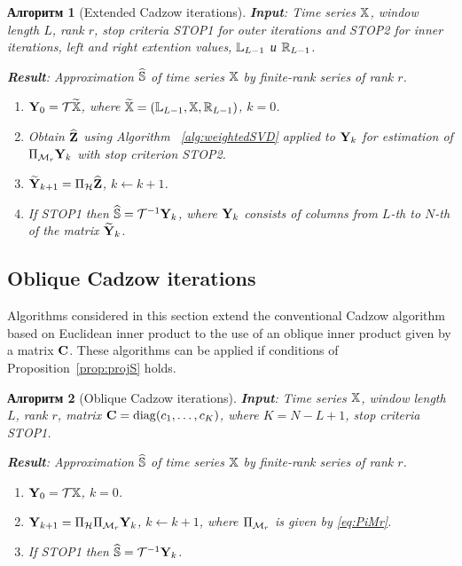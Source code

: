 \documentclass[12pt,a4paper,fleqn,leqno]{article}
\newtheorem{algorithm}{Алгоритм}
\begin{document}
\begin{algorithm}[Extended Cadzow iterations]\label{alg:ECIt}
\textbf{Input}: Time series $\mathbb{X}$, window length $L$, rank $r$,
stop criteria STOP1 for outer iterations and STOP2 for inner iterations,
left and right extention values, $\mathbb{L}_{L-1}$ и $\mathbb{R}_{L-1}$.

\textbf{Result}:
Approximation $\widehat{\mathbb{S}}$ of time series $\mathbb{X}$ by finite-rank series of rank $r$.

\begin{enumerate}
\item
$\mathbf{Y}_0 = \mathcal{T} \widetilde{\mathbb{X}}$, where $\widetilde{\mathbb{X}}=(\mathbb{L}_{L-1}, \mathbb{X}, \mathbb{R}_{L-1})$, $k=0$.
\item
Obtain $\widehat{\mathbf{Z}}$ using Algorithm ~\ref{alg:weightedSVD} applied to $\mathbf{Y}_k$ for estimation of $\Pi_{\mathcal{M}_r} \mathbf{Y}_{k}$ with stop criterion STOP2.
\item
$\widetilde{\mathbf{Y}}_{k+1} = \Pi_{\mathcal{H}}  \widehat{\mathbf{Z}}$, $k\leftarrow k+1$.
\item
If STOP1 then $\widehat{\mathbb{S}} = \mathcal{T}^{-1} \mathbf{Y}_k$, where $\mathbf{Y}_k$ consists of columns from $L$-th to $N$-th of the matrix $\widetilde{\mathbf{Y}}_{k}$.
\end{enumerate}
\end{algorithm}


\subsection{Oblique Cadzow iterations}

Algorithms considered in this section extend the conventional Cadzow algorithm based on Euclidean inner product to the use of an oblique inner product given by a matrix $\mathbf{C}$.
These algorithms can be applied if conditions of Proposition~\ref{prop:projS} holds.

\begin{algorithm}[Oblique Cadzow iterations]
\label{alg:obliqueCadzow}
\textbf{Input}: Time series $\mathbb{X}$, window length $L$, rank $r$, matrix $\mathbf{C}=\mathop{\mathrm{diag}}(c_1,\ldots, c_K)$, where $K=N-L+1$,
stop criteria STOP1.

\textbf{Result}:
Approximation $\widehat{\mathbb{S}}$ of time series $\mathbb{X}$ by finite-rank series of rank $r$.

\begin{enumerate}
\item
$\mathbf{Y}_0 = \mathcal{T} \mathbb{X}$, $k=0$.
\item
$\mathbf{Y}_{k+1} = \Pi_{\mathcal{H}}  \Pi_{\mathcal{M}_r} \mathbf{Y}_{k}$, $k\leftarrow k+1$, where
$\Pi_{\mathcal{M}_r}$ is given by \eqref{eq:PiMr}.
\item
If STOP1 then $\widehat{\mathbb{S}} = \mathcal{T}^{-1} \mathbf{Y}_k$.
\end{enumerate}
\end{algorithm}
\end{document}
